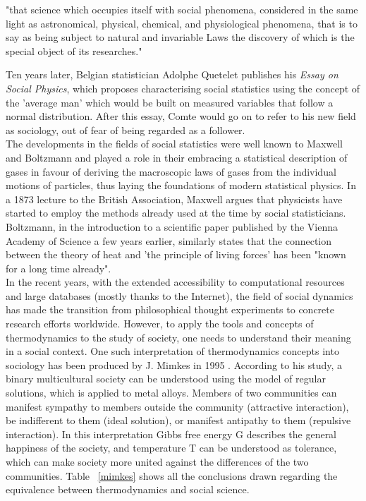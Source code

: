 \documentclass[12pt,openright,twoside]{book}
\begin{document}
\begin{displayquote}
"that science which occupies itself with social phenomena, considered in the same light as astronomical, physical, chemical, and physiological phenomena, that is to say as being subject to natural and invariable Laws the discovery of which is the special object of its researches." \cite{iggers_1959,comte_1825} 
\end{displayquote}

\vspace{14pt}

Ten years later, Belgian statistician Adolphe Quetelet publishes his \textit{Essay on Social Physics}\cite{quetelet_1835}, which proposes characterising social statistics using the concept of the 'average man' which would be built on measured variables that follow a normal distribution\cite{jahoda_2015}. After this essay, Comte would go on to refer to his new field as sociology, out of fear of being regarded as a follower.\\

The developments in the fields of social statistics were well known to Maxwell and Boltzmann and played a role in their embracing a statistical description of gases in favour of  deriving the macroscopic laws of gases from the individual motions of particles, thus laying the foundations of modern statistical physics\cite{porter}.  In a 1873 lecture to the British Association, Maxwell argues that physicists have started to employ the methods already used at the time by social statisticians\cite{maxwell_1873}. Boltzmann, in the introduction to a scientific paper published by the Vienna Academy of Science a few years earlier, similarly states that the connection between the theory of heat and 'the principle of living forces' has been "known for a long time already"\cite{boltzmann_1866}.\\

In the recent years, with the extended accessibility to computational resources and large databases (mostly thanks to the Internet), the field of social dynamics has made the transition from philosophical thought experiments to concrete research efforts worldwide\cite{castellano_fortunato_loreto_2009}. However, to apply the tools and concepts of thermodynamics to the study of society, one needs to understand their meaning in a social context. One such interpretation of thermodynamics concepts into sociology has been produced by J. Mimkes in 1995 \cite{mimkes_1995}. According to his study, a binary multicultural society can be understood using the model of regular solutions, which is applied to metal alloys. Members of two communities can manifest sympathy to members outside the community (attractive interaction), be indifferent to them (ideal solution), or manifest antipathy to them (repulsive interaction). In this interpretation Gibbs free energy G describes the general happiness of the society, and temperature T can be understood as tolerance, which can make society more united against the differences of the two communities. Table ~\ref{mimkes} shows all the conclusions drawn regarding the equivalence between thermodynamics and social science.\\
\end{document}
